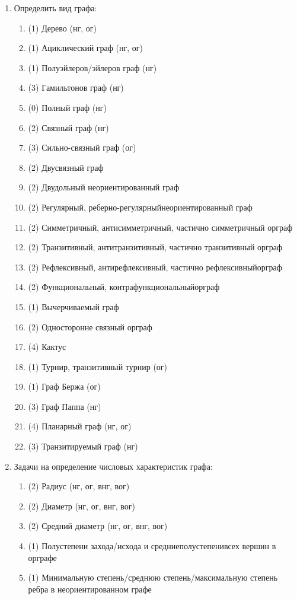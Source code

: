 
\begin{enumerate}
\item Определить вид графа:
  \begin{enumerate}[1.]
  \item (1) Дерево (нг, ог)
  \item (1) Ациклический граф (нг, ог)
  \item (1) Полуэйлеров/эйлеров граф (нг)
  \item (3) Гамильтонов граф (нг)
  \item (0) Полный граф (нг)
  \item (2) Связный граф (нг)
  \item (3) Сильно-связный граф (ог)
  \item (2) Двусвязный граф 
  \item (2) Двудольный неориентированный граф  
  \item (2) Регулярный, реберно-регулярныйнеориентированный граф  
  \item (2) Симметричный, антисимметричный, частично симметричный орграф 
  \item (2) Транзитивный, антитранзитивный, частично транзитивный орграф 
  \item (2) Рефлексивный, антирефлексивный, частично рефлексивныйорграф 
  \item (2) Функциональный, контрафункциональныйорграф 
  \item (1) Вычерчиваемый граф 
  \item (2) Односторонне связный орграф  
  \item (4) Кактус 
  \item (1) Турнир, транзитивный турнир (ог)
  \item (1) Граф Бержа (ог)
  \item (3) Граф Паппа (нг)
  \item (4) Планарный граф (нг, ог)
  \item (3) Транзитируемый граф (нг)
  \end{enumerate}
\item Задачи на определение числовых характеристик графа:
  \begin{enumerate}[1.]
  \item (2) Радиус (нг, ог, внг, вог)
  \item (2) Диаметр (нг, ог, внг, вог)
  \item (2) Средний диаметр (нг, ог, внг, вог)
  \item (1) Полустепени захода/исхода и средниеполустепенивсех вершин в орграфе 
  \item (1) Минимальную степень/среднюю степень/максимальную степень ребра в неориентированном графе  

\end{enumerate}
\end{enumerate}
